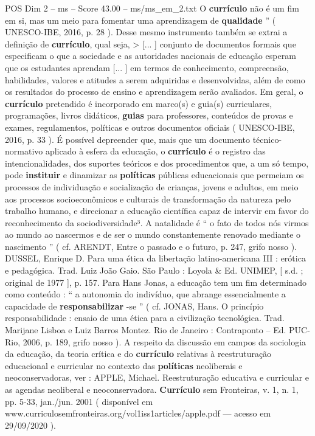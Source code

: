 \begin{textsample}{POS Dim 2 – ms – Score 43.00 – ms/ms\_em\_2.txt}
O \textbf{currículo} não é um fim em si, mas um meio para fomentar uma aprendizagem de \textbf{qualidade} ” ( UNESCO-IBE, 2016, p. 28 ).
Desse mesmo instrumento também se extrai a definição de \textbf{currículo}, qual seja, > [... ] conjunto de documentos formais que especificam o que a sociedade e as autoridades nacionais de educação esperam que os estudantes aprendam [... ] em termos de conhecimento, compreensão, habilidades, valores e atitudes a serem adquiridas e desenvolvidas, além de como os resultados do processo de ensino e aprendizagem serão avaliados.
Em geral, o \textbf{currículo} pretendido é incorporado em marco(s) e guia(s) curriculares, programações, livros didáticos, \textbf{guias} para professores, conteúdos de provas e exames, regulamentos, políticas e outros documentos oficiais ( UNESCO-IBE, 2016, p. 33 ).
É possível depreender que, mais que um documento técnico-normativo aplicado à esfera da educação, o \textbf{currículo} é o registro das intencionalidades, dos suportes teóricos e dos procedimentos que, a um só tempo, pode \textbf{instituir} e dinamizar as \textbf{políticas} públicas educacionais que permeiam os processos de individuação e socialização de crianças, jovens e adultos, em meio aos processos socioeconômicos e culturais de transformação da natureza pelo trabalho humano, e direcionar a educação científica capaz de intervir em favor do reconhecimento da sociodiversidade³.
A natalidade é “ o fato de todos nós virmos ao mundo ao nascermos e de ser o mundo constantemente renovado mediante o nascimento ” ( cf.
ARENDT, Entre o passado e o futuro, p. 247, grifo nosso ).
DUSSEL, Enrique D.
Para uma ética da libertação latino-americana III : erótica e pedagógica.
Trad.
Luiz João Gaio.
São Paulo : Loyola \& Ed.
UNIMEP, [ s.d. ; original de 1977 ], p. 157.
Para Hans Jonas, a educação tem um fim determinado como conteúdo : “ a autonomia do indivíduo, que abrange essencialmente a capacidade de \textbf{responsabilizar} -se ” ( cf.
JONAS, Hans.
O princípio responsabilidade : ensaio de uma ética para a civilização tecnológica.
Trad.
Marijane Lisboa e Luiz Barros Montez.
Rio de Janeiro : Contraponto – Ed.
PUC-Rio, 2006, p. 189, grifo nosso ).
A respeito da discussão em campos da sociologia da educação, da teoria crítica e do \textbf{currículo} relativas à reestruturação educacional e curricular no contexto das \textbf{políticas} neoliberais e neoconservadoras, ver : APPLE, Michael.
Reestruturação educativa e curricular e as agendas neoliberal e neoconservadora. \textbf{Currículo} sem Fronteiras, v. 1, n. 1, pp. 5-33, jan./jun. 2001 ( disponível em www.curriculosemfronteiras.org/vol1iss1articles/apple.pdf — acesso em 29/09/2020 ).

\end{textsample}
